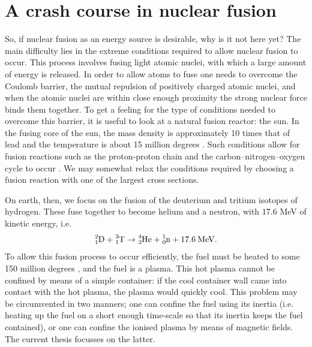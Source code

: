 \vspace*{-2mm}
\section{A crash course in nuclear fusion}
\label{sec: chap1 motivation}

So, if nuclear fusion as an energy source is desirable, why is it not here yet? The main difficulty lies in the extreme conditions required to allow nuclear fusion to occur. This process involves fusing light atomic nuclei, with which a large amount of energy is released. In order to allow atoms to fuse one needs to overcome the Coulomb barrier, the mutual repulsion of positively charged atomic nuclei, and when the atomic nuclei are within close enough proximity the strong nuclear force binds them together. To get a feeling for the type of conditions needed to overcome this barrier, it is useful to look at a natural fusion reactor: the sun. In the fusing core of the sun, the mass density is approximately 10 times that of lead and the temperature is about 15 million degrees \textcelsius. Such conditions allow for fusion reactions such as the proton-proton chain and the carbon–nitrogen–oxygen cycle to occur \cite{bethe1939energy,salpeter1952nuclear,adelberger2011solar}. We may somewhat relax the conditions required by choosing a fusion reaction with one of the largest cross sections. \par 

On earth, then, we focus on the fusion of the deuterium and tritium isotopes of hydrogen. These fuse together to become helium and a neutron, with $17.6$ MeV of kinetic energy, i.e.
\begin{equation*}
    \ce{^{2}_{1} D} + \ce{^{3}_{1} T} \rightarrow \ce{^{4}_{2} He} + \ce{^{1}_{0} n} + 17.6 \: \mathrm{MeV}. 
\end{equation*}
To allow this fusion process to occur efficiently, the fuel must be heated to some 150 million degrees \textcelsius, and the fuel is a plasma. This hot plasma cannot be confined by means of a simple container: if the cool container wall came into contact with the hot plasma, the plasma would quickly cool. This problem may be circumvented in two manners; one can confine the fuel using its inertia (i.e. heating up the fuel on a short enough time-scale so that its inertia keeps the fuel contained), or one can confine the ionised plasma by means of magnetic fields. The current thesis focusses on the latter. \par 

